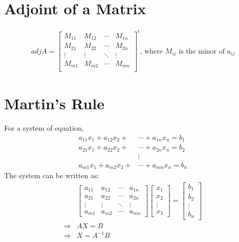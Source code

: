\documentclass[../main.tex]{subfiles}
\begin{document}
	\section{Adjoint of a Matrix}
	\begin{align}
		adj A=\begin{bmatrix}M_{11}&M_{12}&\cdots&M_{1n}\\ M_{21}&M_{22}&\cdots&M_{2n}\\ \vdots&\vdots&\ddots&\vdots\\M_{m1}&M_{m2}&\cdots&M_{mn}\\ \end{bmatrix}^t\text{, where } M_{ij} \text{ is the minor of } a_{ij} 
	\end{align}
	
	\section{Martin's Rule}
	For a system of equation,
	\begin{align*}
		a_{11} x_1 + a_{12} x_2 + & \cdots + a_{1n} x_n = b_1\\
		a_{21} x_1 + a_{22} x_2 + & \cdots + a_{2n} x_n = b_2\\
		& \vdots\\
		a_{m1} x_1 + a_{m2} x_2 + &\cdots + a_{mn} x_n = b_n
	\end{align*}
	The system can be written as:
	\begin{align}
		&\begin{bmatrix}
			a_{11} & a_{12} & \cdots & a_{1n}\\
			a_{21} & a_{22} & \cdots & a_{2n}\\
			\vdots & \vdots & \ddots & \vdots \\
			a_{m1} & a_{m2} & \cdots & a_{mn}
		\end{bmatrix}
		\begin{bmatrix}
			x_1\\
			x_2\\
			\vdots
			\\ x_3
		\end{bmatrix} = 
		\begin{bmatrix}
			b_1 \\
			b_2 \\
			\vdots \\
			b_n
		\end{bmatrix}\\
		\Rightarrow & A X = B\\
		\Rightarrow & X = A^{-1} B
	\end{align}
\end{document}
